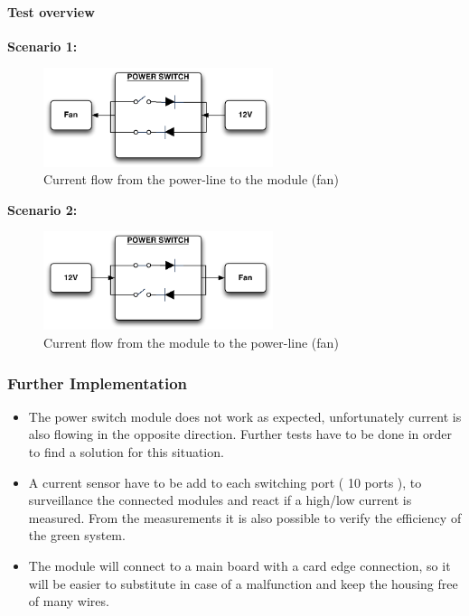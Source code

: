 \paragraph{Test overview}
\textbf{Scenario 1:}
\begin{figure}[H]
	\begin{centering}
		\includegraphics[width=0.6\textwidth,page=1]{images/scenario1.pdf}
		\caption{Current flow from the power-line to the module (fan)}
	\end{centering}
\end{figure}
\textbf{Scenario 2:}
\begin{figure}[H]
	\begin{centering}
		\includegraphics[width=0.6\textwidth,page=1]{images/scenario2.pdf}
		\caption{Current flow from the module to the power-line (fan)}
	\end{centering}
\end{figure}
\subsubsection{Further Implementation}
\begin{itemize}
	\item The power switch module does not work as expected, unfortunately current is also flowing in the opposite direction. Further tests have to be done in order to find a solution for this situation.
	\item A current sensor have to be add to each switching port ( 10 ports ), to surveillance the connected modules and react if a high\//low current is measured. From the measurements it is also possible to verify the efficiency of the green system.
	\item The module will connect to a main board with a card edge connection, so it will be easier to substitute in case of a malfunction and keep the housing free of many wires.
\end{itemize}


